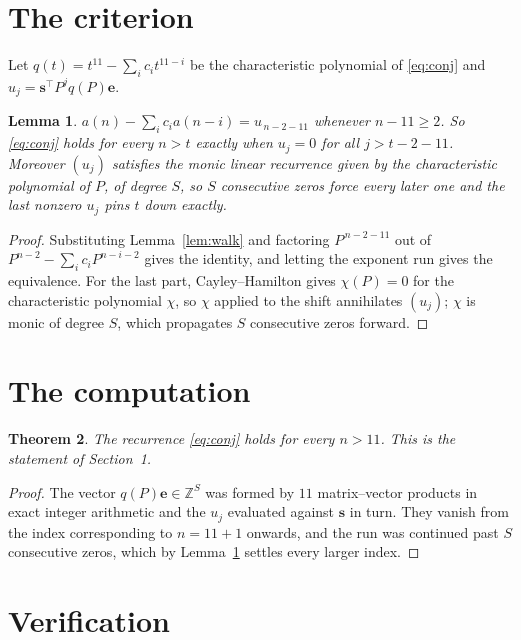 \documentclass[11pt,a4paper]{article}
\theoremstyle{plain}
\newtheorem{theorem}{Theorem}
\newtheorem{lemma}[theorem]{Lemma}
\theoremstyle{definition}
\begin{document}
\section{The criterion}

Let $q(t)=t^{11}-\sum_i c_i t^{11-i}$ be the characteristic polynomial of
\eqref{eq:conj} and $u_j=\mathbf{s}^{\!\top}P^{j}q(P)\mathbf{e}$.

\begin{lemma}\label{lem:crit}
$a(n)-\sum_i c_i a(n-i)=u_{\,n-2-11}$ whenever $n-11\ge2$. So \eqref{eq:conj}
holds for every $n>t$ exactly when $u_j=0$ for all $j>t-2-11$. Moreover $(u_j)$
satisfies the monic linear recurrence given by the characteristic polynomial of $P$, of
degree $S$, so $S$ consecutive zeros force every later one and the last nonzero $u_j$ pins
$t$ down exactly.
\end{lemma}

\begin{proof}
Substituting Lemma~\ref{lem:walk} and factoring $P^{\,n-2-11}$ out of
$P^{n-2}-\sum_i c_i P^{n-i-2}$ gives the identity, and letting the exponent run gives the
equivalence. For the last part, Cayley--Hamilton gives $\chi(P)=0$ for the characteristic
polynomial $\chi$, so $\chi$ applied to the shift annihilates $(u_j)$; $\chi$ is monic of
degree $S$, which propagates $S$ consecutive zeros forward.
\end{proof}

\section{The computation}

\begin{theorem}
The recurrence \eqref{eq:conj} holds for every $n>11$. This is the statement of
Section~1.
\end{theorem}

\begin{proof}
The vector $q(P)\mathbf{e}\in\mathbb{Z}^{S}$ was formed by $11$ matrix--vector
products in exact integer arithmetic and the $u_j$ evaluated against $\mathbf{s}$ in turn.
They vanish from the index corresponding to $n=11+1$ onwards, and the run was continued
past $S$ consecutive zeros, which by Lemma~\ref{lem:crit} settles every larger index.
\end{proof}

\section{Verification}
\end{document}
